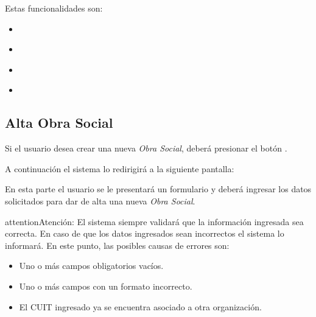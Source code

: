 \documentclass[a4paper,10pt,spanish]{sphinxmanual}
\begin{document}
Estas funcionalidades son:
\begin{itemize}
\item {} 
{\hyperref[obrassociales:alta\string-obrasocial]{}}

\item {} 
{\hyperref[obrassociales:modificar\string-obrasocial]{}}

\item {} 
{\hyperref[obrassociales:eliminar\string-obrasocial]{}}

\item {} 
{\hyperref[obrassociales:formulario\string-busqueda\string-obrasocial]{}}

\end{itemize}


\subsection{Alta Obra Social}
\label{obrassociales:alta-obrasocial}\label{obrassociales:alta-obra-social}
Si el usuario desea crear una nueva \emph{Obra Social}, deberá presionar el botón .


A continuación el sistema lo redirigirá a la siguiente pantalla:


En esta parte el usuario se le presentará un formulario y deberá ingresar los datos solicitados para dar de alta una nueva \emph{Obra Social}.

\begin{notice}{attention}{Atención:}
El sistema siempre validará que la información ingresada sea correcta. En caso de que los datos ingresados sean incorrectos el sistema lo informará.
En este punto, las posibles causas de errores son:
\begin{itemize}
\item {} 
Uno o más campos obligatorios vacíos.

\item {} 
Uno o más campos con un formato incorrecto.

\item {} 
El CUIT ingresado ya se encuentra asociado a otra organización.

\end{itemize}
\end{notice}
\end{document}
